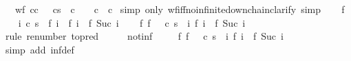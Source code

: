 \begin{isabellebody}
\ \ \ {\isachardoublequoteopen}wf\ {\isacharbraceleft}{\isacharparenleft}c{}{\isacharcomma}c{}{\isacharparenright}{\isachardot}\ {\isasymGamma}\ {\isasymturnstile}\ {\isacharparenleft}c{\isacharcomma}s{\isacharparenright}\ {\isasymrightarrow}\isactrlsup {\isacharasterisk}\ c{}\ {\isasymand}\ {\isasymGamma}\ {\isasymturnstile}\ c{}\ {\isasymrightarrow}\ c{}{\isacharbraceright}{\isachardoublequoteclose}\isanewline
%
\isadelimproof
%
\endisadelimproof
%
\isatagproof
{}\isamarkupfalse%
\ {\isacharparenleft}simp\ only{\isacharcolon}\ wf{\isacharunderscore}iff{\isacharunderscore}no{\isacharunderscore}infinite{\isacharunderscore}down{\isacharunderscore}chain{\isacharcomma}clarify{\isacharcomma}\ simp{\isacharparenright}\isanewline
\ \ \isamarkupfalse%
\ f\isanewline
\ \ \isamarkupfalse%
\ {\isachardoublequoteopen}{\isasymforall}i{\isachardot}\ {\isasymGamma}{\isasymturnstile}{\isacharparenleft}c{\isacharcomma}\ s{\isacharparenright}\ {\isasymrightarrow}\isactrlsup {\isacharasterisk}\ f\ i\ {\isasymand}\ {\isasymGamma}{\isasymturnstile}f\ i\ {\isasymrightarrow}\ f\ {\isacharparenleft}Suc\ i{\isacharparenright}{\isachardoublequoteclose}\isanewline
\ \ \isamarkupfalse%
\ {\isachardoublequoteopen}{\isasymexists}f{\isachardot}\ f\ {}\ {\isacharequal}\ {\isacharparenleft}c{\isacharcomma}\ s{\isacharparenright}\ {\isasymand}\ {\isacharparenleft}{\isasymforall}i{\isachardot}\ {\isasymGamma}{\isasymturnstile}f\ i\ {\isasymrightarrow}\ f\ {\isacharparenleft}Suc\ i{\isacharparenright}{\isacharparenright}{\isachardoublequoteclose}\isanewline
\ \ \ \ \isamarkupfalse%
\ {\isacharparenleft}rule\ renumber\ {\isacharbrackleft}to{\isacharunderscore}pred{\isacharbrackright}{\isacharparenright}\isanewline
\ \ \isamarkupfalse%
\ \isamarkupfalse%
\ not{\isacharunderscore}inf\isanewline
\ \ \isamarkupfalse%
\ {\isachardoublequoteopen}{\isasymnot}\ {\isacharparenleft}{\isasymexists}f{\isachardot}\ f\ {}\ {\isacharequal}\ {\isacharparenleft}c{\isacharcomma}\ s{\isacharparenright}\ {\isasymand}\ {\isacharparenleft}{\isasymforall}i{\isachardot}\ {\isasymGamma}{\isasymturnstile}f\ i\ {\isasymrightarrow}\ f\ {\isacharparenleft}Suc\ i{\isacharparenright}{\isacharparenright}{\isacharparenright}{\isachardoublequoteclose}\isanewline
\ \ \ \ \isamarkupfalse%
\ {\isacharparenleft}simp\ add{\isacharcolon}\ inf{\isacharunderscore}def{\isacharparenright}\isanewline

\end{isabellebody}
